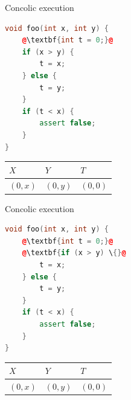 \documentclass{beamer}
\begin{document}
\begin{frame}[fragile]{Concolic execution}
\begin{minipage}{0.49\textwidth}
\begin{lstlisting}[language=C++,escapechar=@]
void foo(int x, int y) {
    @\textbf{int t = 0;}@
    if (x > y) {
        t = x;
    } else {
        t = y;
    }
    if (t < x) {
        assert false;
    }
}
\end{lstlisting}
\end{minipage}
\hfill
\begin{minipage}{0.49\textwidth}
\begin{center}
\begin{tabular}{ | l | l | l | }
\hline
$X$ & $Y$ & $T$ \\
\hline
$(0, x)$ & $(0, y)$ & $(0, 0)$ \\
\hline
\end{tabular}
\end{center}
\end{minipage}
\end{frame}

\begin{frame}[fragile]{Concolic execution}
\begin{minipage}{0.49\textwidth}
\begin{lstlisting}[language=C++,escapechar=@]
void foo(int x, int y) {
    @\textbf{int t = 0;}@
    @\textbf{if (x > y) \{}@
        t = x;
    } else {
        t = y;
    }
    if (t < x) {
        assert false;
    }
}
\end{lstlisting}
\end{minipage}
\hfill
\begin{minipage}{0.49\textwidth}
\begin{center}
\begin{tabular}{ | l | l | l | }
\hline
$X$ & $Y$ & $T$ \\
\hline
$(0, x)$ & $(0, y)$ & $(0, 0)$ \\
\hline
\end{tabular}
\end{center}
\end{minipage}
\end{frame}
\end{document}
